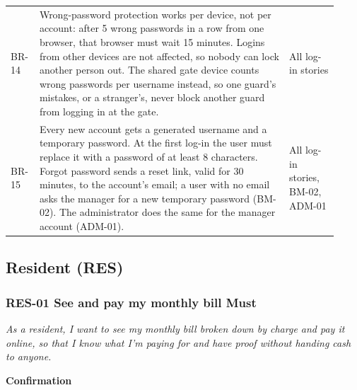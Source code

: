 \documentclass[11pt,a4paper]{report}
\begin{document}
{\begin{longtable}{>{\raggedright\arraybackslash}p{0.067\linewidth}>{\raggedright\arraybackslash}p{0.713\linewidth}>{\raggedright\arraybackslash}p{0.145\linewidth}}
BR-14 & Wrong-password protection works per device, not per account: after 5 wrong passwords in a row from one browser, that browser must wait 15 minutes. Logins from other devices are not affected, so nobody can lock another person out. The shared gate device counts wrong passwords per username instead, so one guard's mistakes, or a stranger's, never block another guard from logging in at the gate. & All log-in stories \\
BR-15 & Every new account gets a generated username and a temporary password. At the first log-in the user must replace it with a password of at least 8 characters. Forgot password sends a reset link, valid for 30 minutes, to the account's email; a user with no email asks the manager for a new temporary password (BM-02). The administrator does the same for the manager account (ADM-01). & All log-in stories, BM-02, ADM-01 \\
\end{longtable}
}

\subsection{Resident (RES)}

\subsubsection*{RES-01 \textperiodcentered{} See and pay my monthly bill \textperiodcentered{} Must}

\emph{As a resident, I want to see my monthly bill broken down by charge and pay it online, so that I know what I'm paying for and have proof without handing cash to anyone.}

\medskip\noindent\textbf{Confirmation}\par
\end{document}
